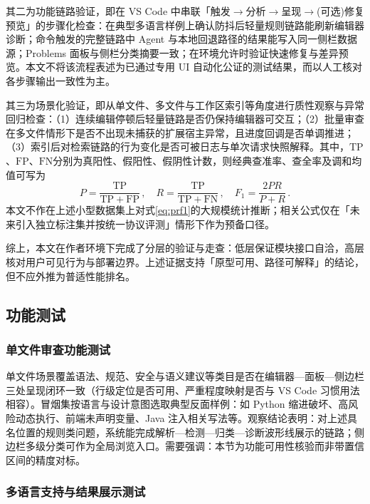 其二为功能链路验证，即在 VS Code 中串联「触发$\rightarrow$分析$\rightarrow$呈现$\rightarrow$(可选)修复预览」的步骤化检查：在典型多语言样例上确认防抖后轻量规则链路能刷新编辑器诊断；命令触发的完整链路中 Agent 与本地回退路径的结果能写入同一侧栏数据源；Problems 面板与侧栏分类摘要一致；在环境允许时验证快速修复与差异预览。本文不将该流程表述为已通过专用 UI 自动化公证的测试结果，而以人工核对各步骤输出一致性为主。

其三为场景化验证，即从单文件、多文件与工作区索引等角度进行质性观察与异常回归检查：（1）连续编辑停顿后轻量链路是否仍保持编辑器可交互；（2）批量审查在多文件情形下是否不出现未捕获的扩展宿主异常，且进度回调是否单调推进；（3）索引后对检索链路的行为变化是否可被日志与单次请求快照解释。其中，$\mathrm{TP}$、$\mathrm{FP}$、$\mathrm{FN}$分别为真阳性、假阳性、假阴性计数，则经典查准率、查全率及调和均值可写为\cite{sokolova2009systematic}
\begin{equation}
P=\frac{\mathrm{TP}}{\mathrm{TP}+\mathrm{FP}}\,,\quad
R=\frac{\mathrm{TP}}{\mathrm{TP}+\mathrm{FN}}\,,\quad
F_{1}=\frac{2PR}{P+R}\,.
\label{eq:prf1}
\end{equation}
本文不作在上述小型数据集上对式\eqref{eq:prf1}的大规模统计推断；相关公式仅在「未来引入独立标注集并按统一协议评测」情形下作为预备口径。

综上，本文在作者环境下完成了分层的验证与走查：低层保证模块接口自洽，高层核对用户可见行为与部署边界。上述证据支持「原型可用、路径可解释」的结论，但不应外推为普适性能排名。

\subsection{功能测试}
\subsubsection{单文件审查功能测试}

单文件场景覆盖语法、规范、安全与语义建议等类目是否在编辑器—面板—侧边栏三处呈现闭环一致（行级定位是否可用、严重程度映射是否与 VS Code 习惯用法相容）\cite{microsoft2025vscodeapi}。冒烟集按语言与设计意图选取典型反面样例：如 Python 缩进破坏、高风险动态执行、前端未声明变量、Java 注入相关写法等。观察结论表明：对上述具名位置的规则类问题，系统能完成解析—检测—归类—诊断波形线展示的链路；侧边栏多级分类可作为全局浏览入口。需要强调：本节为功能可用性核验而非带置信区间的精度对标。

\subsubsection{多语言支持与结果展示测试}

